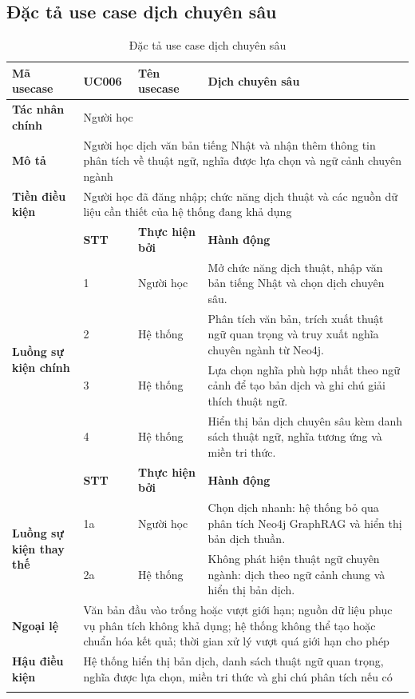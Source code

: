 \documentclass[../DoAn.tex]{subfiles}
\begin{document}
\subsection{Đặc tả use case dịch chuyên sâu}
\label{subsection:2.3.4}

{\footnotesize\singlespacing
\begin{longtable}{|p{2.8cm}|p{1.0cm}|p{2.2cm}|p{7.5cm}|}
\hline
\textbf{Mã usecase} & \textbf{UC006} & \textbf{Tên usecase} & \multicolumn{1}{l|}{Dịch chuyên sâu} \\
\hline
\textbf{Tác nhân chính} & \multicolumn{3}{p{11.1cm}|}{Người học} \\
\hline
\textbf{Mô tả} & \multicolumn{3}{p{11.1cm}|}{Người học dịch văn bản tiếng Nhật và nhận thêm thông tin phân tích về thuật ngữ, nghĩa được lựa chọn và ngữ cảnh chuyên ngành} \\
\hline
\textbf{Tiền điều kiện} & \multicolumn{3}{p{11.1cm}|}{Người học đã đăng nhập; chức năng dịch thuật và các nguồn dữ liệu cần thiết của hệ thống đang khả dụng} \\
\hline
 & \textbf{STT} & \textbf{Thực hiện bởi} & \textbf{Hành động} \\
\hline
\multirow{4}{2.8cm}{\textbf{Luồng sự kiện chính}} & 1 & Người học & Mở chức năng dịch thuật, nhập văn bản tiếng Nhật và chọn dịch chuyên sâu. \\
\cline{2-4}
 & 2 & Hệ thống & Phân tích văn bản, trích xuất thuật ngữ quan trọng và truy xuất nghĩa chuyên ngành từ Neo4j. \\
\cline{2-4}
 & 3 & Hệ thống & Lựa chọn nghĩa phù hợp nhất theo ngữ cảnh để tạo bản dịch và ghi chú giải thích thuật ngữ. \\
\cline{2-4}
 & 4 & Hệ thống & Hiển thị bản dịch chuyên sâu kèm danh sách thuật ngữ, nghĩa tương ứng và miền tri thức. \\
\hline
 & \textbf{STT} & \textbf{Thực hiện bởi} & \textbf{Hành động} \\
\hline
\multirow{2}{2.8cm}{\textbf{Luồng sự kiện thay thế}} & 1a & Người học & Chọn dịch nhanh: hệ thống bỏ qua phân tích Neo4j GraphRAG và hiển thị bản dịch thuần. \\
\cline{2-4}
 & 2a & Hệ thống & Không phát hiện thuật ngữ chuyên ngành: dịch theo ngữ cảnh chung và hiển thị bản dịch. \\
\hline
\textbf{Ngoại lệ} & \multicolumn{3}{p{11.1cm}|}{Văn bản đầu vào trống hoặc vượt giới hạn; nguồn dữ liệu phục vụ phân tích không khả dụng; hệ thống không thể tạo hoặc chuẩn hóa kết quả; thời gian xử lý vượt quá giới hạn cho phép} \\
\hline
\textbf{Hậu điều kiện} & \multicolumn{3}{p{11.1cm}|}{Hệ thống hiển thị bản dịch, danh sách thuật ngữ quan trọng, nghĩa được lựa chọn, miền tri thức và ghi chú phân tích nếu có} \\
\hline
\caption{Đặc tả use case dịch chuyên sâu}
\label{table:UC006}\\
\end{longtable}
}
\end{document}
